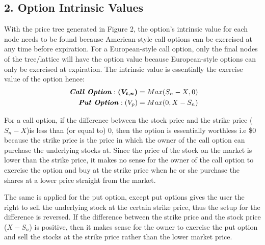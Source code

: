 \documentclass[12pt, letterpaper]{article}
\begin{document}
\subsection*{2. Option Intrinsic Values}
With the price tree generated in Figure 2, the option's intrinsic value for each node needs to be found because American-style call options can be exercised at any time before expiration.
For a European-style call option, only the final nodes of the tree/lattice will have the option value because European-style options can only be exercised at expiration. 
The intrinsic value is essentially the exercise value of the option hence: %
\begin{eqnarray*}
  \textrm{\textit{ \textbf{Call Option}}}: \boldsymbol{(V_{t,n})} = Max({S_n - X}, 0) \\
  \textrm{\textit{ \textbf{Put Option}}}: (V_p) = Max(0, {X - S_n}) 
\end{eqnarray*}

For a call option, if the difference between the stock price and the strike price (${S_n - X}$)is less than (or equal to) 0, then the option is essentially worthless i.e \$0 because the strike price is the price in which the owner of the call option can purchase the underlying stocks at.
Since the price of the stock on the market is lower than the strike price, it makes no sense for the owner of the call option to exercise the option and buy at the strike price when he or she purchase the shares at a lower price straight from the market.

The same is applied for the put option, except put options gives the user the right to sell the underlying stock at the certain strike price, thus the setup for the difference is reversed.
If the difference between the strike price and the stock price (${X - S_n}$) is positive, then it makes sense for the owner to exercise the put option and sell the stocks at the strike price rather than the lower market price.
\end{document}
